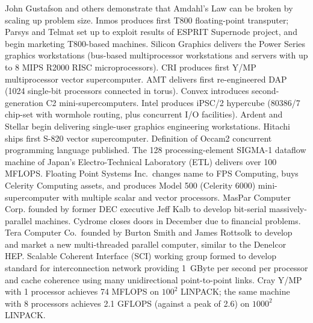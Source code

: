 	{John Gustafson and others demonstrate that
	Amdahl's Law can be broken
	by scaling up problem size.}
	{Inmos produces first T800 floating-point transputer;
	Parsys and Telmat set up to exploit results of
	ESPRIT Supernode project,
	and begin marketing T800-based machines.}
        {Silicon Graphics delivers the Power Series graphics workstations
        (bus-based multiprocessor workstations and servers
	with up to 8 MIPS R2000 RISC microprocessors).}
	{CRI produces first Y/MP multiprocessor vector supercomputer.}
	{AMT delivers first re-engineered DAP
	(1024 single-bit processors connected in torus).}
	{Convex introduces second-generation C2 mini-supercomputers.}
	{Intel produces iPSC/2 hypercube
	(80386/7 chip-set with wormhole routing,
	plus concurrent I/O facilities).}
	{Ardent and Stellar begin delivering single-user graphics
	engineering workstations.}
	{Hitachi ships first S-820 vector supercomputer.}
	{Definition of Occam2 concurrent programming language published.}
	{The 128 processing-element SIGMA-1 dataflow machine
	of Japan's Electro-Technical Laboratory (ETL)
	delivers over 100 MFLOPS.}
        {Floating Point Systems Inc.\ changes name to FPS Computing,
	buys Celerity Computing assets, 
	and produces Model 500 (Celerity 6000)
	mini-supercomputer with multiple scalar and vector processors.}
	{MasPar Computer Corp. founded by former DEC executive Jeff Kalb
	to develop bit-serial massively-parallel machines.}
	{Cydrome closes doors in December due to financial problems.}
	{Tera Computer Co.\ founded by Burton Smith and James Rottsolk to
	develop and market a new multi-threaded parallel computer,
	similar to the Denelcor HEP.}
	{Scalable Coherent Interface (SCI) working group formed
	to develop standard for interconnection network providing
	1~GByte per second per processor and cache coherence
	using many unidirectional point-to-point links.}
	{Cray Y/MP with 1 processor achieves 74 MFLOPS
	on $100^2$ LINPACK;
	the same machine with 8 processors achieves 2.1 GFLOPS
	(against a peak of 2.6)
	on $1000^2$ LINPACK.}
